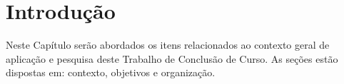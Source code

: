 \chapter*[Introdução]{Introdução}
\label{chap:intro}

Neste Capítulo serão abordados os itens relacionados ao contexto geral de
aplicação e pesquisa deste Trabalho de Conclusão de Curso. As seções estão
dispostas em: contexto, objetivos e organização.





